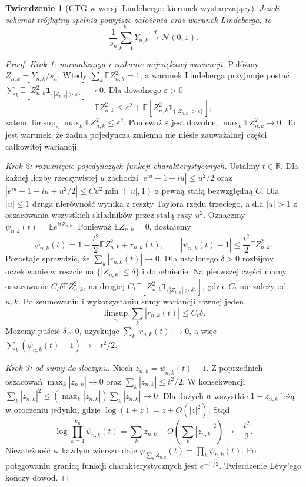 \documentclass[11pt,a4paper,oneside]{report}
\numberwithin{equation}{chapter}
\theoremstyle{plain}
\newtheorem{twierdzenie}{Twierdzenie}[chapter]
\theoremstyle{definition}
\theoremstyle{remark}
\newcommand{\R}{\mathbb{R}}
\newcommand{\E}{\mathbb{E}}
\newcommand{\ind}[1]{\mathbf{1}_{#1}}
\newcommand{\Normal}{\mathcal{N}}
\begin{document}
\begin{twierdzenie}[CTG w wersji Lindeberga: kierunek wystarczający]
Jeżeli schemat trójkątny spełnia powyższe założenia
oraz warunek Lindeberga, to
\[
\frac{1}{s_n}\sum_{k=1}^{k_n}Y_{n,k}
\xrightarrow{d}\Normal(0,1).
\]
\end{twierdzenie}
\begin{proof}
\emph{Krok 1: normalizacja i znikanie największej
wariancji.} Połóżmy $Z_{n,k}=Y_{n,k}/s_n$.
Wtedy $\sum_k\E Z_{n,k}^2=1$, a warunek Lindeberga
przyjmuje postać
$\sum_k\E[Z_{n,k}^2\ind{\{|Z_{n,k}|>\varepsilon\}}]\to0$.
Dla dowolnego $\varepsilon>0$
\[
\E Z_{n,k}^2\leq\varepsilon^2+
\E[Z_{n,k}^2\ind{\{|Z_{n,k}|>\varepsilon\}}],
\]
zatem $\limsup_n\max_k\E Z_{n,k}^2\leq\varepsilon^2$.
Ponieważ $\varepsilon$ jest dowolne,
$\max_k\E Z_{n,k}^2\to0$. To jest warunek,
że żadna pojedyncza zmienna nie niesie zauważalnej
części całkowitej wariancji.

\emph{Krok 2: rozwinięcie pojedynczych funkcji
charakterystycznych.} Ustalmy $t\in\R$.
Dla każdej liczby rzeczywistej $u$ zachodzi
$|e^{iu}-1-iu|\leq u^2/2$ oraz
$|e^{iu}-1-iu+u^2/2|\leq C u^2\min(|u|,1)$
z pewną stałą bezwzględną $C$.
Dla $|u|\leq1$ druga nierówność wynika z reszty
Taylora rzędu trzeciego, a dla $|u|>1$ z oszacowania
wszystkich składników przez stałą razy $u^2$.
Oznaczmy $\psi_{n,k}(t)=\E e^{itZ_{n,k}}$.
Ponieważ $\E Z_{n,k}=0$, dostajemy
\[
\psi_{n,k}(t)=1-\frac{t^2}{2}\E Z_{n,k}^2+r_{n,k}(t),
\qquad
|\psi_{n,k}(t)-1|\leq\frac{t^2}{2}\E Z_{n,k}^2.
\]
Pozostaje sprawdzić, że $\sum_k|r_{n,k}(t)|\to0$.
Dla ustalonego $\delta>0$ rozbijmy oczekiwanie
w reszcie na $\{|Z_{n,k}|\leq\delta\}$ i dopełnienie.
Na pierwszej części mamy oszacowanie
$C_t\delta\E Z_{n,k}^2$, na drugiej
$C_t\E[Z_{n,k}^2\ind{\{|Z_{n,k}|>\delta\}}]$,
gdzie $C_t$ nie zależy od $n,k$. Po zsumowaniu
i wykorzystaniu sumy wariancji równej jeden,
\[
\limsup_n\sum_k|r_{n,k}(t)|\leq C_t\delta.
\]
Możemy puścić $\delta\downarrow0$, uzyskując
$\sum_k|r_{n,k}(t)|\to0$, a więc
$\sum_k(\psi_{n,k}(t)-1)\to-t^2/2$.

\emph{Krok 3: od sumy do iloczynu.} Niech
$z_{n,k}=\psi_{n,k}(t)-1$. Z poprzednich oszacowań
$\max_k|z_{n,k}|\to0$ oraz
$\sum_k|z_{n,k}|\leq t^2/2$.
W konsekwencji
$\sum_k|z_{n,k}|^2\leq
(\max_k|z_{n,k}|)\sum_k|z_{n,k}|\to0$.
Dla dużych $n$ wszystkie $1+z_{n,k}$ leżą
w otoczeniu jedynki, gdzie
$\log(1+z)=z+O(|z|^2)$. Stąd
\[
\log\prod_{k=1}^{k_n}\psi_{n,k}(t)
=\sum_kz_{n,k}+O\!\left(\sum_k|z_{n,k}|^2\right)
\longrightarrow-\frac{t^2}{2}.
\]
Niezależność w każdym wierszu daje
$\varphi_{\sum_kZ_{n,k}}(t)=\prod_k\psi_{n,k}(t)$.
Po potęgowaniu granicą funkcji charakterystycznych
jest $e^{-t^2/2}$. Twierdzenie Lévy'ego kończy dowód.
\end{proof}
\end{document}
